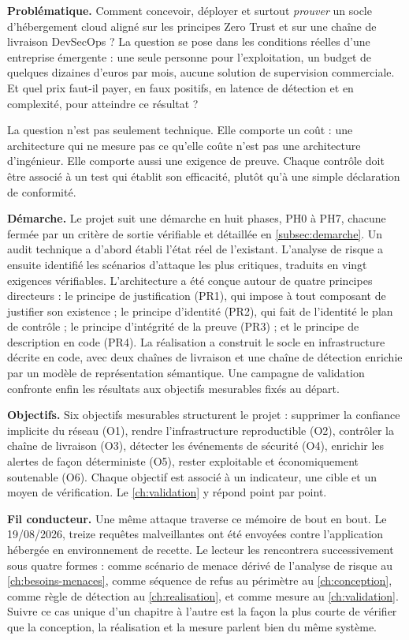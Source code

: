 \textbf{Problématique.} Comment concevoir, déployer et surtout \emph{prouver} un socle
d'hébergement cloud aligné sur les principes Zero Trust et sur une chaîne de livraison
DevSecOps ? La question se pose dans les conditions réelles d'une entreprise émergente : une
seule personne pour l'exploitation, un budget de quelques dizaines d'euros par mois, aucune
solution de supervision commerciale. Et quel prix faut-il payer, en faux positifs, en latence de
détection et en complexité, pour atteindre ce résultat ?

La question n'est pas seulement technique. Elle comporte un coût : une architecture qui ne
mesure pas ce qu'elle coûte n'est pas une architecture d'ingénieur. Elle comporte aussi une
exigence de preuve. Chaque contrôle doit être associé à un test qui établit son efficacité,
plutôt qu'à une simple déclaration de conformité.

\textbf{Démarche.} Le projet suit une démarche en huit phases, PH0 à PH7, chacune fermée par un
critère de sortie vérifiable et détaillée en \cref{subsec:demarche}. Un audit technique a d'abord
établi l'état réel de l'existant. L'analyse de risque a ensuite identifié les scénarios
d'attaque les plus critiques, traduits en vingt exigences vérifiables. L'architecture a été
conçue autour de quatre principes directeurs : le principe de justification (PR1), qui impose à
tout composant de justifier son existence ; le principe d'identité (PR2), qui fait de l'identité
le plan de contrôle ; le principe d'intégrité de la preuve (PR3) ; et le principe de description
en code (PR4). La réalisation a construit le socle en infrastructure décrite en code, avec deux
chaînes de livraison et une chaîne de détection enrichie par un modèle de représentation
sémantique. Une campagne de validation confronte enfin les résultats aux objectifs mesurables
fixés au départ.

\textbf{Objectifs.} Six objectifs mesurables structurent le projet : supprimer la confiance
implicite du réseau (O1), rendre l'infrastructure reproductible (O2), contrôler la chaîne de
livraison (O3), détecter les événements de sécurité (O4), enrichir les alertes de façon
déterministe (O5), rester exploitable et économiquement soutenable (O6). Chaque objectif est
associé à un indicateur, une cible et un moyen de vérification. Le \cref{ch:validation} y répond point par
point.

\textbf{Fil conducteur.} Une même attaque traverse ce mémoire de bout en bout. Le 19/08/2026,
treize requêtes malveillantes ont été envoyées contre l'application hébergée en environnement de
recette. Le lecteur les rencontrera successivement sous quatre formes : comme scénario de menace
dérivé de l'analyse de risque au \cref{ch:besoins-menaces}, comme séquence de refus au périmètre au \cref{ch:conception},
comme règle de détection au \cref{ch:realisation}, et comme mesure au \cref{ch:validation}. Suivre ce cas unique d'un
chapitre à l'autre est la façon la plus courte de vérifier que la conception, la réalisation et
la mesure parlent bien du même système.

